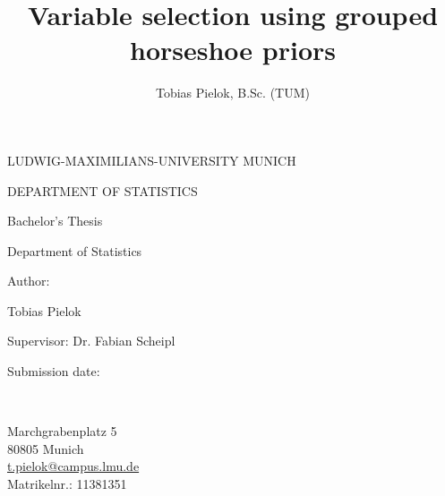 \documentclass[12pt,letterpaper]{article}
\numberwithin{equation}{subsection}
\begin{document}
\begin{center}\uppercase{Ludwig-Maximilians-University Munich}\end{center}
\begin{center}\uppercase{Department of Statistics}\end{center}

\vspace{3cm}

\title{Variable selection using grouped horseshoe priors}
\date{\vspace{-5ex}}
{\let\newpage\relax\maketitle}
\thispagestyle{empty}


\begin{center}
  \begin{large}
    \begin{Large}
      Bachelor's Thesis\\
    \end{Large}
    Department of Statistics  \\
  \end{large}
\end{center}
\begin{center}
  Author:\\
  \begin{large}
    Tobias Pielok\\
  \end{large}
\end{center}
\vspace{1cm}
\begin{center}
  \begin{large}
    Supervisor: Dr. Fabian Scheipl
  \end{large}
\end{center}

\begin{center}  \begin{large}
    Submission date: \\%
  \end{large}
\end{center}

\vspace{1,5cm}

\begin{center}
  \begin{large}
    \author{Tobias Pielok, B.Sc. (TUM)}\\
 \end{large}
  Marchgrabenplatz 5\\ 
  80805 Munich\\ 
  \url{t.pielok@campus.lmu.de}\\
  Matrikelnr.:  11381351\\
\end{center}
\end{document}
